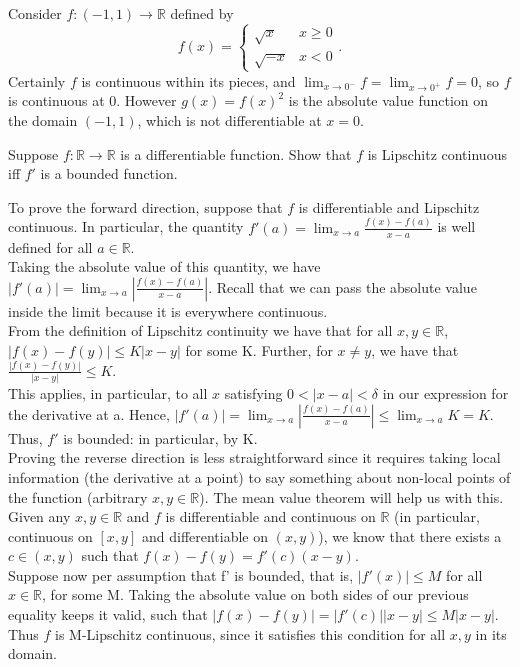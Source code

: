 \documentclass[11 pt]{article}
\begin{document}
\begin{solution}
	Consider $f:(-1,1)\to\mathbb{R}$ defined by  \[
	f(x) = 
	\begin{cases}
		\sqrt{x} & x\geq0 \\
		\sqrt{-x} & x<0
	\end{cases}
	.\] 
	Certainly $f$ is continuous within its pieces, and $\lim_{x\to 0^{-}}f=\lim _{x\to 0^{+}}f=0$, so $f$ is continuous at 0. However $g(x)=f(x)^2$ is the absolute value function on the domain $(-1,1)$, which is not differentiable at $x=0$.
\end{solution}
\pagebreak
\begin{problem}
	Suppose $f:\mathbb{R}\to\mathbb{R}$ is a differentiable function. Show that $f$ is Lipschitz continuous iff $f'$ is a bounded function.
\end{problem}
\begin{solution}
		To prove the forward direction, suppose that $f$ is differentiable and Lipschitz continuous. In particular, the quantity $f'(a)= \lim_{x\to a}\frac{f(x)-f(a)}{x-a}$ is well defined for all $a\in\mathbb{R}$.\\
		Taking the absolute value of this quantity, we have $|f'(a)|=\lim_{x\to a}|\frac{f(x)-f(a)}{x-a}|$. Recall that we can pass the absolute value inside the limit because it is everywhere continuous.\\
		From the definition of Lipschitz continuity we have that for all  $x,y\in\mathbb{R}$, $|f(x)-f(y)|\leq K|x-y|$ for some K. Further, for $x\neq y$, we have that $\frac{|f(x)-f(y)|}{|x-y|}\leq K$.\\
		This applies, in particular, to all $x$ satisfying $0<|x-a|<\delta$ in our expression for the derivative at a. Hence, $|f'(a)|=\lim_{x\to a}|\frac{f(x)-f(a)}{x-a}|\leq \lim_{x\to a}K=K$. Thus, $f'$ is bounded: in particular, by K.\\

		Proving the reverse direction is less straightforward since it requires taking local information (the derivative at a point) to say something about non-local points of the function (arbitrary $x,y\in\mathbb{R}$). The mean value theorem will help us with this. Given any $x,y\in\mathbb{R}$ and $f$ is differentiable and continuous on $\mathbb{R}$ (in particular, continuous on $[x,y]$ and differentiable on $(x,y)$), we know that there exists a $c\in(x,y)$ such that $f(x)-f(y)=f'(c)(x-y)$.\\
		Suppose now per assumption that f' is bounded, that is, $|f'(x)|\leq M$ for all $x\in\mathbb{R}$, for some M. Taking the absolute value on both sides of our previous equality keeps it valid, such that $|f(x)-f(y)|=|f'(c)||x-y|\leq M|x-y|$.\\
		Thus $f$ is M-Lipschitz continuous, since it satisfies this condition for all $x,y$ in its domain.

\end{solution}
\end{document}

